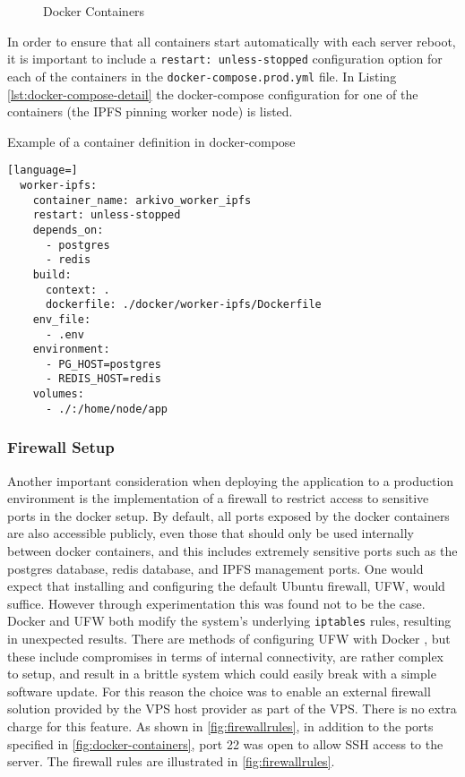 \begin{figure}[h]
    \centering
    
    \caption[Docker Containers]{Docker Containers}
    \label{fig:docker-containers}
\end{figure}

In order to ensure that all containers start automatically with each server reboot, it is important to include a \texttt{restart: unless-stopped} configuration option for each of the containers in the \texttt{docker-compose.prod.yml} file. In Listing \autoref{lst:docker-compose-detail} the docker-compose configuration for one of the containers (the IPFS pinning worker node) is listed.

\begin{listing}[H]
  \caption{Example of a container definition in docker-compose}
  \label{lst:docker-compose-detail}
  \begin{lstlisting}[language=]
  worker-ipfs:
    container_name: arkivo_worker_ipfs
    restart: unless-stopped
    depends_on:
      - postgres
      - redis
    build:
      context: .
      dockerfile: ./docker/worker-ipfs/Dockerfile
    env_file:
      - .env
    environment:
      - PG_HOST=postgres
      - REDIS_HOST=redis
    volumes:
      - ./:/home/node/app
  \end{lstlisting}
\end{listing}

\vspace{0.5cm}

\subsubsection{Firewall Setup}

Another important consideration when deploying the application to a production environment is the implementation of a firewall to restrict access to sensitive ports in the docker setup. By default, all ports exposed by the docker containers are also accessible publicly, even those that should only be used internally between docker containers, and this includes extremely sensitive ports such as the postgres database, redis database, and IPFS management ports.
One would expect that installing and configuring the default Ubuntu firewall, UFW, would suffice. However through experimentation this was found not to be the case. Docker and UFW both modify the system's underlying \texttt{iptables} rules, resulting in unexpected results. There are methods of configuring UFW with Docker \cite{jarrousseHowUseUFW2023}\cite{fengChaifengUfwdocker2024}, but these include compromises in terms of internal connectivity, are rather complex to setup, and result in a brittle system which could easily break with a simple software update. For this reason the choice was to enable an external firewall solution provided by the VPS host provider as part of the VPS. There is no extra charge for this feature. As shown in \autoref{fig:firewallrules}, in addition to the ports specified in \autoref{fig:docker-containers}, port 22 was open to allow SSH access to the server. The firewall rules are illustrated in \autoref{fig:firewallrules}.


